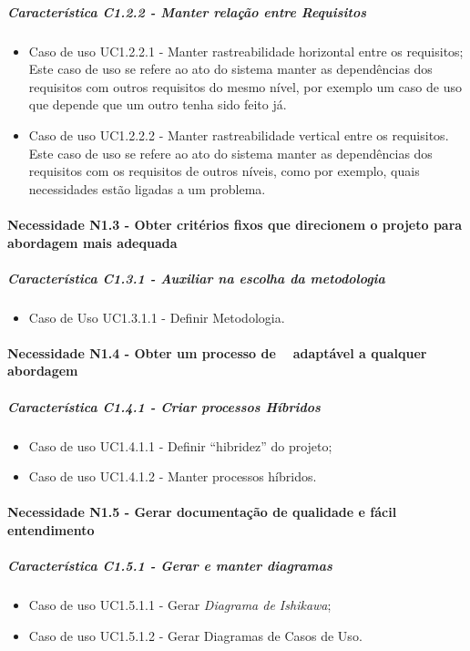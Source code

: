 	\subparagraph{Característica C1.2.2 - Manter relação entre Requisitos}
		\begin{itemize}
			\item Caso de uso UC1.2.2.1 - Manter rastreabilidade horizontal entre os requisitos;\\
				Este caso de uso se refere ao ato do sistema manter as dependências dos requisitos com outros requisitos do mesmo nível, por exemplo um caso de uso que depende que um outro tenha sido feito já.
			\item Caso de uso UC1.2.2.2 - Manter rastreabilidade vertical entre os requisitos.\\
				Este caso de uso se refere ao ato do sistema manter as dependências dos requisitos com os requisitos de outros níveis, como por exemplo, quais necessidades estão ligadas a um problema.
		\end{itemize}

\paragraph{Necessidade N1.3 - Obter critérios fixos que direcionem o projeto para abordagem mais adequada}
	\subparagraph{Característica C1.3.1 - Auxiliar na escolha da metodologia}
		\begin{itemize}
			\item Caso de Uso UC1.3.1.1 - Definir Metodologia.\\
		\end{itemize}

\paragraph{Necessidade N1.4 - Obter um processo de \er~ adaptável a qualquer abordagem}
	\subparagraph{Característica C1.4.1 - Criar processos Híbridos}
	\begin{itemize}
		\item Caso de uso UC1.4.1.1 - Definir ``hibridez'' do projeto;
		\item Caso de uso UC1.4.1.2 - Manter processos híbridos.
	\end{itemize}

\paragraph{Necessidade N1.5 - Gerar documentação de qualidade e fácil entendimento}
	\subparagraph{Característica C1.5.1 - Gerar e manter diagramas}
		\begin{itemize}
			\item Caso de uso UC1.5.1.1 - Gerar \textit{Diagrama de Ishikawa};
			\item Caso de uso UC1.5.1.2 - Gerar Diagramas de Casos de Uso.
		\end{itemize}

